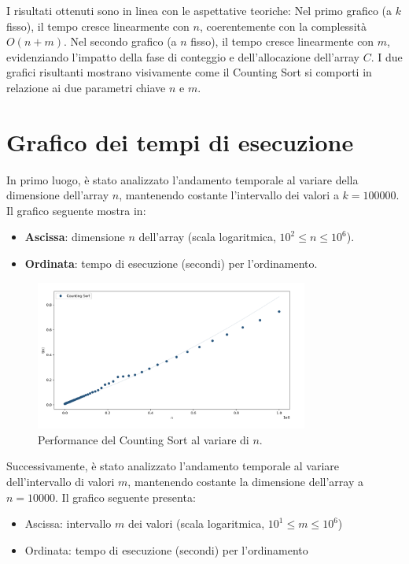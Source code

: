 \documentclass[a4paper, 12pt, oneside]{book}
\begin{document}
I risultati ottenuti sono in linea con le aspettative teoriche:
Nel primo grafico (a \(k\) fisso), il tempo cresce linearmente con \(n\), coerentemente con la complessità \(O(n + m)\).
Nel secondo grafico (a \(n\) fisso), il tempo cresce linearmente con \(m\), evidenziando l'impatto della fase di conteggio e dell'allocazione dell'array \(C\).
I due grafici risultanti mostrano visivamente come il Counting Sort si comporti in relazione ai due parametri chiave \(n\) e \(m\).

\section{Grafico dei tempi di esecuzione}

In primo luogo, è stato analizzato l'andamento temporale al variare della dimensione dell'array \(n\), mantenendo costante l'intervallo dei valori a \(k = 100000\). 
Il grafico seguente mostra in:
\begin{itemize}
    \item \textbf{Ascissa}: dimensione \(n\) dell'array (scala logaritmica, \(10^2 \leq n \leq 10^6\)).
    \item \textbf{Ordinata}: tempo di esecuzione (secondi) per l'ordinamento.
\end{itemize}

\begin{figure}[H]
    \centering
    \includegraphics[width=0.8\textwidth]{images/grafico_counting_sort_n.png}
    \caption{Performance del Counting Sort al variare di \(n\).}
    \label{fig:counting_sort_n}
\end{figure}

\noindent Successivamente, è stato analizzato l'andamento temporale al variare dell'intervallo di valori \(m\), mantenendo costante la dimensione dell'array a \(n = 10000\). 
Il grafico seguente presenta:
\begin{itemize}
    \item Ascissa: intervallo \(m\) dei valori (scala logaritmica, \(10^1 \leq m \leq 10^6\))
    \item Ordinata: tempo di esecuzione (secondi) per l'ordinamento
\end{itemize}
\end{document}
